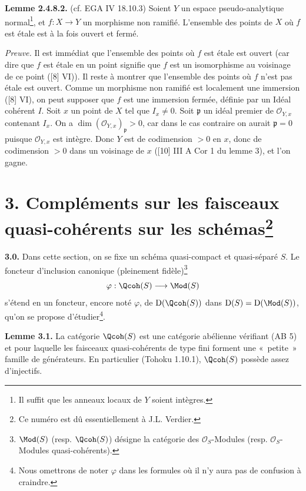\textbf{Lemme 2.4.8.2.} (cf. EGA IV 18.10.3) Soient $Y$ un espace pseudo-analytique normal\footnote{Il suffit que les anneaux locaux de $Y$ soient intègres.}, et $f:X\longrightarrow Y$ un morphisme non ramifié. L'ensemble des points de $X$ où $f$ est étale est à la fois ouvert et fermé.

\emph{Preuve.} Il est immédiat que l'ensemble des points où $f$ est étale est ouvert (car dire que $f$ est étale en un point signifie que $f$ est un isomorphisme au voisinage de ce point ([8] VI)). Il reste à montrer que l'ensemble des points où $f$ n'est pas étale est ouvert. Comme un morphisme non ramifié est localement une immersion ([8] VI), on peut supposer que $f$ est une immersion fermée, définie par un Idéal cohérent $I$. Soit $x$ un point de $X$ tel que $I_x\ne0$. Soit $\mathfrak p$ un idéal premier de $\mathcal O_{Y,x}$ contenant $I_x$. On a $\dim(\mathcal O_{Y,x})_{\mathfrak p}>0$, car dans le cas contraire on aurait $\mathfrak p=0$ puisque $\mathcal O_{Y,x}$ est intègre. Donc $Y$ est de codimension $>0$ en $x$, donc de codimension $>0$ dans un voisinage de $x$ ([10] III A Cor 1 du lemme 3), et l'on gagne.

\section*{3. Compléments sur les faisceaux quasi-cohérents sur les schémas\protect\footnote{Ce numéro est dû essentiellement à J.L. Verdier.}}

\textbf{3.0.} Dans cette section, on se fixe un schéma quasi-compact et quasi-séparé $S$. Le foncteur d'inclusion canonique (pleinement fidèle)\footnote{$\Mod(S)$ (resp. $\Qcoh(S)$) désigne la catégorie des $\mathcal O_S$-Modules (resp. $\mathcal O_S$-Modules quasi-cohérents).}
\[
 \varphi:\Qcoh(S)\longrightarrow\Mod(S)
\]
s'étend en un foncteur, encore noté $\varphi$, de $\mathrm D(\Qcoh(S))$ dans $\mathrm D(S)=\mathrm D(\Mod(S))$, qu'on se propose d'étudier\footnote{Nous omettrons de noter $\varphi$ dans les formules où il n'y aura pas de confusion à craindre.}.

\textbf{Lemme 3.1.} La catégorie $\Qcoh(S)$ est une catégorie abélienne vérifiant (AB 5) et pour laquelle les faisceaux quasi-cohérents de type fini forment une «~petite~» famille de générateurs. En particulier (Tohoku 1.10.1), $\Qcoh(S)$ possède assez d'injectifs.

